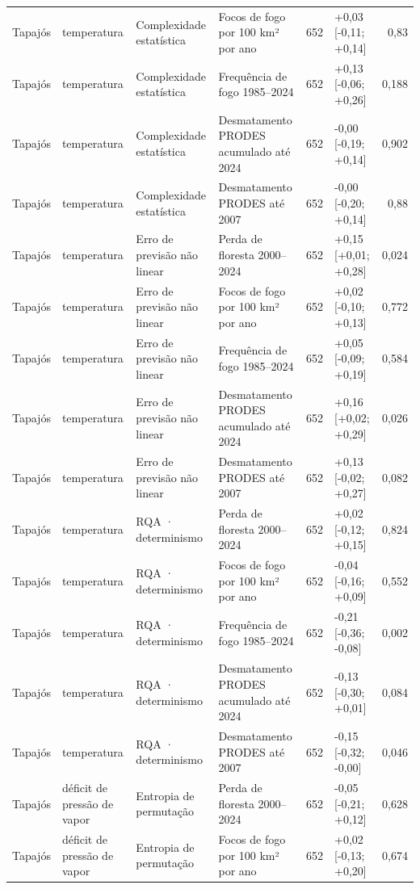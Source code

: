 \begin{table}
{\begin{tabular}{llllrlr}
Tapajós & temperatura & Complexidade estatística & Focos de fogo por 100 km² por ano & 652 & +0,03 [-0,11; +0,14] & 0,83 \\
Tapajós & temperatura & Complexidade estatística & Frequência de fogo 1985–2024 & 652 & +0,13 [-0,06; +0,26] & 0,188 \\
Tapajós & temperatura & Complexidade estatística & Desmatamento PRODES acumulado até 2024 & 652 & -0,00 [-0,19; +0,14] & 0,902 \\
Tapajós & temperatura & Complexidade estatística & Desmatamento PRODES até 2007 & 652 & -0,00 [-0,20; +0,14] & 0,88 \\
Tapajós & temperatura & Erro de previsão não linear & Perda de floresta 2000–2024 & 652 & +0,15 [+0,01; +0,28] & 0,024 \\
Tapajós & temperatura & Erro de previsão não linear & Focos de fogo por 100 km² por ano & 652 & +0,02 [-0,10; +0,13] & 0,772 \\
Tapajós & temperatura & Erro de previsão não linear & Frequência de fogo 1985–2024 & 652 & +0,05 [-0,09; +0,19] & 0,584 \\
Tapajós & temperatura & Erro de previsão não linear & Desmatamento PRODES acumulado até 2024 & 652 & +0,16 [+0,02; +0,29] & 0,026 \\
Tapajós & temperatura & Erro de previsão não linear & Desmatamento PRODES até 2007 & 652 & +0,13 [-0,02; +0,27] & 0,082 \\
Tapajós & temperatura & RQA · determinismo & Perda de floresta 2000–2024 & 652 & +0,02 [-0,12; +0,15] & 0,824 \\
Tapajós & temperatura & RQA · determinismo & Focos de fogo por 100 km² por ano & 652 & -0,04 [-0,16; +0,09] & 0,552 \\
Tapajós & temperatura & RQA · determinismo & Frequência de fogo 1985–2024 & 652 & -0,21 [-0,36; -0,08] & 0,002 \\
Tapajós & temperatura & RQA · determinismo & Desmatamento PRODES acumulado até 2024 & 652 & -0,13 [-0,30; +0,01] & 0,084 \\
Tapajós & temperatura & RQA · determinismo & Desmatamento PRODES até 2007 & 652 & -0,15 [-0,32; -0,00] & 0,046 \\
Tapajós & déficit de pressão de vapor & Entropia de permutação & Perda de floresta 2000–2024 & 652 & -0,05 [-0,21; +0,12] & 0,628 \\
Tapajós & déficit de pressão de vapor & Entropia de permutação & Focos de fogo por 100 km² por ano & 652 & +0,02 [-0,13; +0,20] & 0,674 \\

\end{tabular}}
\end{table}

